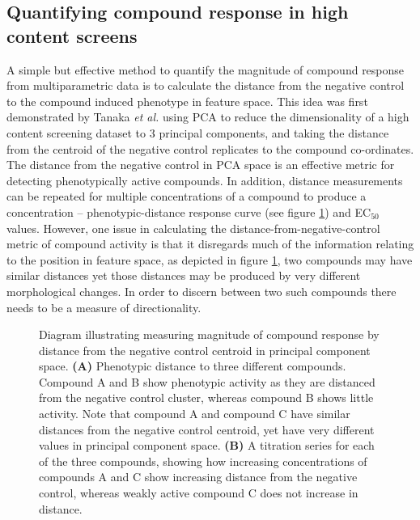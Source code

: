 \documentclass[a4paper,11pt,twoside,openright]{scrbook}
\begin{document}
\subsection{Quantifying compound response in high content screens}
A simple but effective method to quantify the magnitude of compound response from multiparametric data is to calculate the distance from the negative control to the compound induced phenotype in feature space.
This idea was first demonstrated by Tanaka \textit{et al.} using PCA to reduce the dimensionality of a high content screening dataset to 3 principal components, and taking the distance from the centroid of the negative control replicates to the compound co-ordinates. \cite{Tanaka2005}
The distance from the negative control in PCA space is an effective metric for detecting phenotypically active compounds.
In addition, distance measurements can be repeated for multiple concentrations of a compound to produce a concentration -- phenotypic-distance response curve (see figure \ref{figure:pca_dist}) and EC$_{50}$ values.
However, one issue in calculating the distance-from-negative-control metric of compound activity is that it disregards much of the information relating to the position in feature space, as depicted in figure \ref{figure:pca_dist}, two compounds may have similar distances yet those distances may be produced by very different morphological changes.
In order to discern between two such compounds there needs to be a measure of directionality.

\begin{figure}
    \captionsetup{width=0.8\textwidth}
    \caption[Compound distance in principal component space]{
    Diagram illustrating measuring magnitude of compound response by distance from the negative control centroid in principal component space.
    \textbf{(A)} Phenotypic distance to three different compounds.
    Compound A and B show phenotypic activity as they are distanced from the negative control cluster, whereas compound B shows little activity.
    Note that compound A and compound C have similar distances from the negative control centroid, yet have very different values in principal component space.
    \textbf{(B)} A titration series for each of the three compounds, showing how increasing concentrations of compounds A and C show increasing distance from the negative control, whereas weakly active compound C does not increase in distance.
}
    
    \label{figure:pca_dist}
\end{figure}
\end{document}
